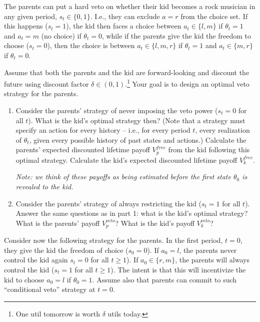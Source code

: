 \documentclass[a4paper]{article}
\begin{document}
	The parents can put a hard veto on whether their kid becomes a rock musician in any given period, $s_t \in \{0,1\}$. I.e., they can exclude $a=r$ from the choice set. If this happens ($s_t=1$), the kid then faces a choice between $a_t \in \{l,m\}$ if $\theta_t=1$ and $a_t = m$ (no choice) if $\theta_t=0$, while if the parents give the kid the freedom to choose ($s_t=0$), then the choice is between $a_t \in \{l,m,r\}$ if $\theta_t=1$ and $a_t \in \{m,r\}$ if $\theta_t=0$.
	
	Assume that both the parents and the kid are forward-looking and discount the future using discount factor $\delta \in (0,1)$.\footnote{One util tomorrow is worth $\delta$ utils today.} Your goal is to design an optimal veto strategy for the parents. 
	
	\begin{enumerate}
		\item Consider the parents' strategy of never imposing the veto power ($s_t=0$ for all $t$). What is the kid's optimal strategy then? (Note that a strategy must specify an action for every history -- i.e., for every period $t$, every realization of $\theta_t$, given every possible history of past states and actions.) Calculate the parents' expected discounted lifetime payoff $V_p^{free}$ from the kid following this optimal strategy. Calculate the kid's expected discounted lifetime payoff $V_k^{free}$.
		
		\emph{Note: we think of these payoffs as being estimated before the first state $\theta_0$ is revealed to the kid.}
		
		\item Consider the parents' strategy of always restricting the kid ($s_t=1$ for all $t$). Answer the same questions as in part 1: what is the kid's optimal strategy? What is the parents' payoff $V_p^{veto}$? What is the kid's payoff $V_k^{veto}$?
	\end{enumerate}
	
	Consider now the following strategy for the parents. In the first period, $t=0$, they give the kid the freedom of choice ($s_0=0$). If $a_0=l$, the parents never control the kid again $s_t=0$ for all $t \geq 1$). If $a_0 \in \{r,m\}$, the parents will always control the kid ($s_t=1$ for all $t \geq 1$). The intent is that this will incentivize the kid to choose $a_0=l$ if $\theta_0=1$. Assume also that parents can commit to such ``conditional veto'' strategy at $t=0$.
	
\end{document}
